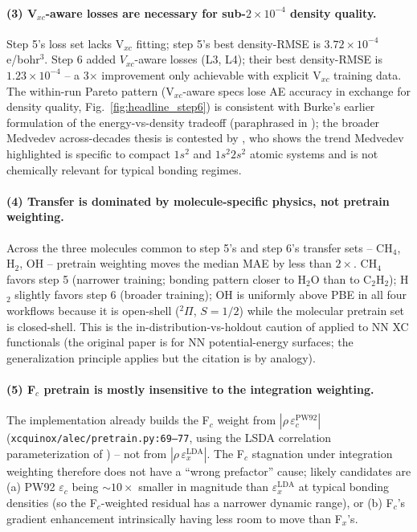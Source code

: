 \documentclass[11pt,letterpaper]{article}
\begin{document}
\paragraph{(3) V$_{xc}$-aware losses are necessary for sub-$2\times 10^{-4}$ density quality.}
Step 5's loss set lacks V$_{xc}$ fitting; step 5's best density-RMSE is $3.72\times 10^{-4}$
e/bohr$^3$. Step 6 added $V_{xc}$-aware losses (L3, L4); their best density-RMSE is
$1.23\times 10^{-4}$ -- a 3$\times$ improvement only achievable with explicit V$_{xc}$
training data. The within-run Pareto pattern (V$_{xc}$-aware specs lose AE accuracy in
exchange for density quality, Fig.~\ref{fig:headline_step6}) is consistent with Burke's earlier
formulation of the energy-vs-density tradeoff (paraphrased in \citet{Kepp2017}); the
broader Medvedev across-decades thesis \citep{Medvedev2017} is contested by
\citet{Kepp2017}, who shows the trend Medvedev highlighted is specific to compact
$1s^2$ and $1s^2 2s^2$ atomic systems and is not chemically relevant for typical
bonding regimes.

\paragraph{(4) Transfer is dominated by molecule-specific physics, not pretrain weighting.}
Across the three molecules common to step 5's and step 6's transfer sets -- CH$_4$, H$_2$,
OH -- pretrain weighting moves the median MAE by less than $2\times$. CH$_4$ favors step
5 (narrower training; bonding pattern closer to H$_2$O than to C$_2$H$_2$); H$_2$ slightly
favors step 6 (broader training); OH is uniformly above PBE in all four workflows because
it is open-shell ($^2\Pi$, $S=1/2$) while the molecular pretrain set is closed-shell.
This is the in-distribution-vs-holdout caution of \citet{BehlerParrinello2007} applied to
NN XC functionals (the original paper is for NN potential-energy surfaces; the
generalization principle applies but the citation is by analogy).

\paragraph{(5) F$_c$ pretrain is mostly insensitive to the integration weighting.}
The implementation already builds the F$_c$ weight from $|\rho\,\varepsilon_c^{\text{PW92}}|$
(\texttt{xcquinox/alec/pretrain.py:69--77}, using the LSDA correlation parameterization of
\citealp{PerdewWang1992}) -- not from $|\rho\,\varepsilon_x^{\text{LDA}}|$. The F$_c$
stagnation under integration weighting therefore does not have a ``wrong prefactor'' cause;
likely candidates are (a) PW92 $\varepsilon_c$ being $\sim 10\times$ smaller in magnitude
than $\varepsilon_x^{\text{LDA}}$ at typical bonding densities (so the F$_c$-weighted
residual has a narrower dynamic range), or (b) F$_c$'s gradient enhancement intrinsically
having less room to move than F$_x$'s.
\end{document}
